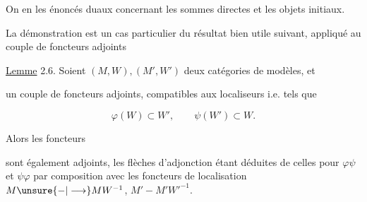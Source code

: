 
On en  les énoncés duaux concernant les sommes directes et les objets initiaux.

La démonstration est un cas particulier du résultat bien utile suivant, appliqué au couple de foncteurs adjoints



\uline{Lemme} 2.6. Soient $(M,W),(M',W')$ deux catégories de modèles, et


un couple de foncteurs adjoints, compatibles aux localiseurs i.e. tels que

\[
\varphi(W)\subset W',\qquad \psi(W')\subset W.
\]

Alors les foncteurs 


sont également adjoints, les flèches d'adjonction  étant déduites de celles pour $\varphi\psi$ et $\psi\varphi$ par composition avec les foncteurs de localisation $M\unsure{{-}|\longrightarrow}MW^{-1}$, $M'{-}M'W'^{-1}$.

